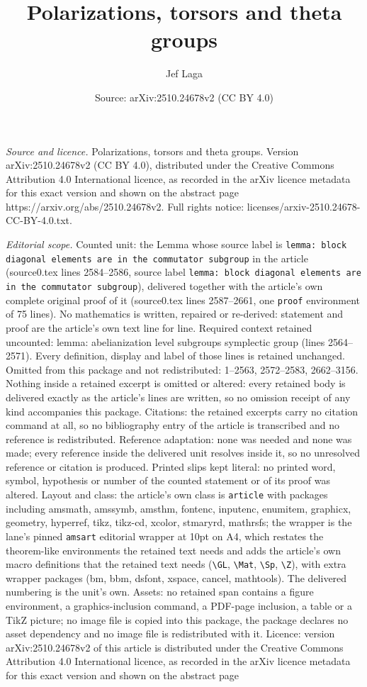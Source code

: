 \documentclass[10pt,a4paper]{amsart}
\title[Polarizations, torsors and theta groups]{Polarizations, torsors and theta groups}
\author{Jef Laga}
\date{Source: arXiv:2510.24678v2 (CC BY 4.0)}
\begin{document}
\maketitle

\noindent\emph{Source and licence.} Polarizations, torsors and theta groups. Version arXiv:2510.24678v2 (CC BY 4.0), distributed under the Creative Commons Attribution 4.0 International licence, as recorded in the arXiv licence metadata for this exact version and shown on the abstract page https://arxiv.org/abs/2510.24678v2. Full rights notice: licenses/arxiv-2510.24678-CC-BY-4.0.txt.\par\smallskip

\noindent\textit{Editorial scope.} Counted unit: the Lemma whose source label is \texttt{lemma: block diagonal elements are in the commutator subgroup} in the article (source0.tex lines 2584--2586, source label \texttt{lemma: block diagonal elements are in the commutator subgroup}), delivered together with the article's own complete original proof of it (source0.tex lines 2587--2661, one \texttt{proof} environment of 75 lines). No mathematics is written, repaired or re-derived: statement and proof are the article's own text line for line. Required context retained uncounted: lemma: abelianization level subgroups symplectic group (lines 2564--2571). Every definition, display and label of those lines is retained unchanged. Omitted from this package and not redistributed: 1--2563, 2572--2583, 2662--3156. Nothing inside a retained excerpt is omitted or altered: every retained body is delivered exactly as the article's lines are written, so no omission receipt of any kind accompanies this package. Citations: the retained excerpts carry no citation command at all, so no bibliography entry of the article is transcribed and no reference is redistributed. Reference adaptation: none was needed and none was made; every reference inside the delivered unit resolves inside it, so no unresolved reference or citation is produced. Printed slips kept literal: no printed word, symbol, hypothesis or number of the counted statement or of its proof was altered. Layout and class: the article's own class is \texttt{article} with packages including amsmath, amssymb, amsthm, fontenc, inputenc, enumitem, graphicx, geometry, hyperref, tikz, tikz-cd, xcolor, stmaryrd, mathrsfs; the wrapper is the lane's pinned \texttt{amsart} editorial wrapper at 10pt on A4, which restates the theorem-like environments the retained text needs and adds the article's own macro definitions that the retained text needs (\texttt{\textbackslash GL}, \texttt{\textbackslash Mat}, \texttt{\textbackslash Sp}, \texttt{\textbackslash Z}), with extra wrapper packages (bm, bbm, dsfont, xspace, cancel, mathtools). The delivered numbering is the unit's own. Assets: no retained span contains a figure environment, a graphics-inclusion command, a PDF-page inclusion, a table or a TikZ picture; no image file is copied into this package, the package declares no asset dependency and no image file is redistributed with it. Licence: version arXiv:2510.24678v2 of this article is distributed under the Creative Commons Attribution 4.0 International licence, as recorded in the arXiv licence metadata for this exact version and shown on the abstract page 
\end{document}
